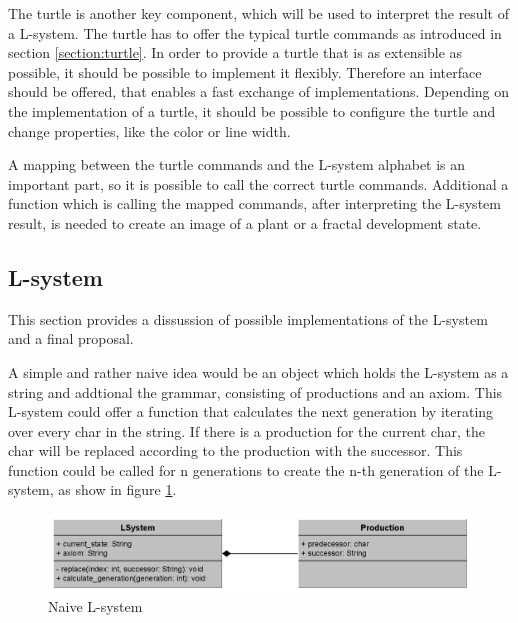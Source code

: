 \documentclass[english]{cpp-hmwk}
\begin{document}
\medskip

\noindent The turtle is another key component, which will be used to interpret the result of a L-system. The turtle has to offer the typical turtle commands as introduced in section \ref{section:turtle}. In order to provide a turtle that is as extensible as possible, it should be possible to implement it flexibly. Therefore an interface should be offered, that enables a fast exchange of implementations. Depending on the implementation of a turtle, it should be possible to configure the turtle and change properties, like the color or line width.

\medskip
\noindent A mapping between the turtle commands and the L-system alphabet is an important part, so it is possible to call the correct turtle commands. Additional a function which is calling the mapped commands, after interpreting the L-system result, is needed to create an image of a plant or a fractal development state.


\subsection{L-system}
\label{section:lsystem_discussion}
This section provides a dissussion of possible implementations of the L-system and a final proposal.

\medskip

\noindent A simple and rather naive idea would be an object which holds the L-system as a string and addtional the grammar, consisting of productions and an axiom. This L-system could offer a function that calculates the next generation by iterating over every char in the string. If there is a production for the current char, the char will be replaced according to the production with the successor. This function could be called for n generations to create the n-th generation of the L-system, as show in figure \ref{figure:naive_lsystem}.

\begin{figure}[h!]
	\centering
	\includegraphics[width=1\columnwidth]{../graphs/LSystem/naive/class_diagram_l_system_naive.png}
	\caption{Naive L-system}
	\label{figure:naive_lsystem}
\end{figure}
\end{document}
